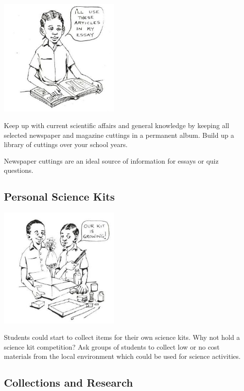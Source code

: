 \begin{multicols}{2}
\begin{center}
\includegraphics[width=0.45\textwidth]{./img/source/science-news.jpg}
\end{center}

Keep up with current scientific affairs and
general knowledge by keeping all selected
newspaper and magazine cuttings in a permanent
album. Build up a library of cuttings over your
school years.

Newspaper cuttings are an ideal source of
information for essays or quiz questions.

\subsection{Personal Science Kits}

\begin{center}
\includegraphics[width=0.45\textwidth]{./img/source/science-kits.jpg}
\end{center}

Students could start to collect items for their
own science kits. Why not hold a science kit
competition? Ask groups of students to collect
low or no cost materials from the local
environment which could be used for science
activities.

\subsection{Collections and Research}


\end{multicols}
